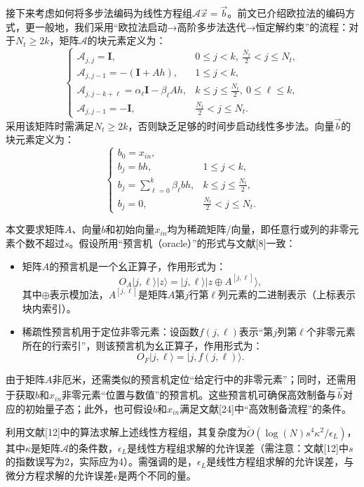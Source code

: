 \documentclass{article}
\theoremstyle{definition}
\begin{document}
接下来考虑如何将多步法编码为线性方程组\(\mathcal{A}\vec{x} = \vec{b}\)。前文已介绍欧拉法的编码方式，更一般地，我们采用“欧拉法启动→高阶多步法迭代→恒定解约束”的流程：对于\(N_t \geq 2k\)，矩阵\(\mathcal{A}\)的块元素定义为：
\[
\begin{cases}
\mathcal{A}_{j,j} = \mathbf{I}, & 0 \leq j < k ,\ \frac{N_t}{2} < j \leq N_t, \\
\mathcal{A}_{j,j-1} = -(\mathbf{I}+ Ah), & 1 \leq j < k, \\
\mathcal{A}_{j,j - k + \ell} = \alpha_\ell \mathbf{I} - \beta_\ell Ah, & k \leq j \leq \frac{N_t}{2},\ 0 \leq \ell \leq k, \\
\mathcal{A}_{j,j-1} = -\mathbf{I}, & \frac{N_t}{2} < j \leq N_t.
\end{cases}
\]
采用该矩阵时需满足\(N_t \geq 2k\)，否则缺乏足够的时间步启动线性多步法。向量\(\vec{b}\)的块元素定义为：
\[
\begin{cases}
b_0 = x_{in}, \\
b_j = bh, & 1 \leq j < k, \\
b_j = \sum_{\ell=0}^k \beta_\ell bh, & k \leq j \leq \frac{N_t}{2}, \\
b_j = 0, & \frac{N_t}{2} < j \leq N_t.
\end{cases} 
\]

本文要求矩阵\(A\)、向量\(b\)和初始向量\(x_{in}\)均为稀疏矩阵/向量，即任意行或列的非零元素个数不超过\(s\)。假设所用“预言机（oracle）”的形式与文献[8]一致：
\begin{itemize}[label={-}]
    \item 矩阵\(A\)的预言机是一个幺正算子，作用形式为：
    \[
    O_A |j,\ell\rangle |z\rangle = |j,\ell\rangle |z \oplus A^{[j,\ell]}\rangle, 
    \]
    其中\(\oplus\)表示模加法，\(A^{[j,\ell]}\)是矩阵\(A\)第\(j\)行第\(\ell\)列元素的二进制表示（上标表示块内索引）。
    \item 稀疏性预言机用于定位非零元素：设函数\(f(j,\ell)\)表示“第\(j\)列第\(\ell\)个非零元素所在的行索引”，则该预言机为幺正算子，作用形式为：
    \[
    O_F |j,\ell\rangle = |j, f(j,\ell)\rangle. 
    \]
\end{itemize}

由于矩阵\(A\)非厄米，还需类似的预言机定位“给定行中的非零元素”；同时，还需用于获取\(b\)和\(x_{in}\)非零元素“位置与数值”的预言机。这些预言机可确保高效制备与\(\vec{b}\)对应的初始量子态；此外，也可假设\(b\)和\(x_{in}\)满足文献[24]中“高效制备流程”的条件。

利用文献[12]中的算法求解上述线性方程组，其复杂度为\(\tilde{O}\left( \log(N) s^4 \kappa^2 / \epsilon_L \right)\)，其中\(\kappa\)是矩阵\(\mathcal{A}\)的条件数，\(\epsilon_L\)是线性方程组求解的允许误差（需注意：文献[12]中\(s\)的指数误写为2，实际应为4）。需强调的是，\(\epsilon_L\)是线性方程组求解的允许误差，与微分方程求解的允许误差\(\epsilon\)是两个不同的量。
\end{document}
